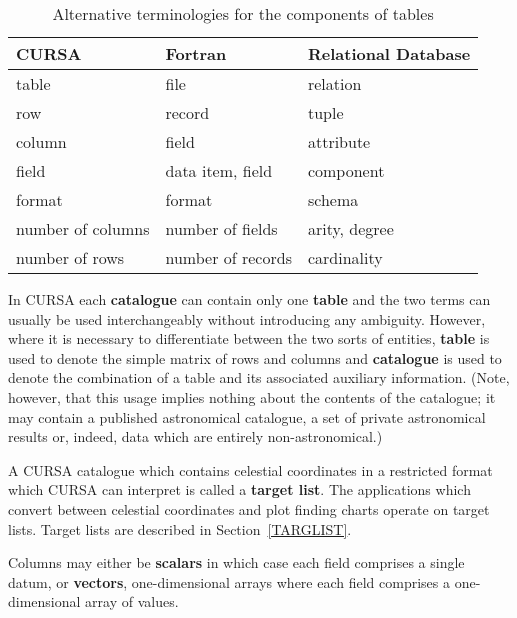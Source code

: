\documentclass[twoside,11pt]{starlink}
\begin{document}
\begin{table}[htbp]

\begin{center}
\begin{tabular}{lll}
CURSA             &  Fortran           &  Relational Database \\ \hline
table             &  file              &  relation      \\
row               &  record            &  tuple         \\
column            &  field             &  attribute     \\
field             &  data item, field  &  component     \\
format            &  format            &  schema        \\
number of columns &  number of fields  &  arity, degree \\
number of rows    &  number of records &  cardinality   \\
\end{tabular}
\end{center}

\caption{Alternative terminologies for the components of tables
\label{TABLE_NOT} }

\end{table}

In CURSA each \textbf{catalogue} can contain only one \textbf{table} and the two terms can usually be used interchangeably without
introducing any ambiguity. However, where it is necessary to
differentiate between the two sorts of entities, \textbf{table} is used
to denote the simple matrix of rows and columns and \textbf{catalogue} is
used to denote the combination of a table and its associated auxiliary
information. (Note, however, that this usage implies nothing about the
contents of the catalogue; it may contain a published astronomical catalogue,
a set of private astronomical results or, indeed, data which are entirely
non-astronomical.)

A CURSA catalogue which contains celestial coordinates in a restricted
format which CURSA can interpret is called a \textbf{target list}.  The
applications which convert between celestial coordinates and plot
finding charts operate on target lists.  Target lists are described in
Section~\ref{TARGLIST}.

Columns may either be \textbf{scalars} in which case each field comprises
a single datum, or \textbf{vectors}, one-dimensional arrays where each
field comprises a one-dimensional array of values.
\end{document}
